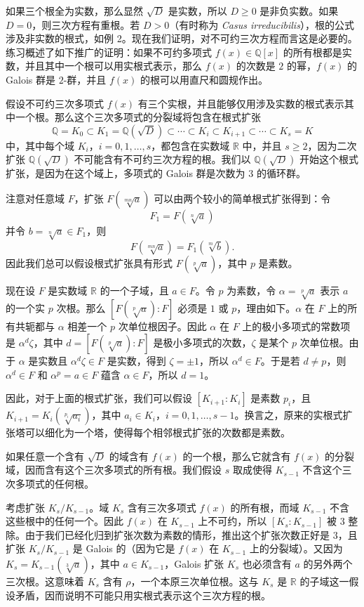 如果三个根全为实数，那么显然 $\sqrt D$ 是实数，所以 $D\geq 0$ 是非负实数。如果 $D=0$，则三次方程有重根。若 $D>0$（有时称为 \emph{Casus irreducibilis}），根的公式涉及非实数的根式，如例 2。现在我们证明，对不可约三次方程而言这是必要的。练习概述了如下推广的证明：如果不可约多项式 $f(x)\in\mathbb Q[x]$ 的所有根都是实数，并且其中一个根可以用实根式表示，那么 $f(x)$ 的次数是 $2$ 的幂，$f(x)$ 的 Galois 群是 $2$-群，并且 $f(x)$ 的根可以用直尺和圆规作出。

假设不可约三次多项式 $f(x)$ 有三个实根，并且能够仅用涉及实数的根式表示其中一个根。那么这个三次多项式的分裂域将包含在根式扩张
\[
\mathbb Q=K_0\subset K_1=\mathbb Q(\sqrt D)\subset\cdots\subset K_i\subset K_{i+1}\subset\cdots\subset K_s=K
\]
中，其中每个域 $K_i$，$i=0,1,\ldots,s$，都包含在实数域 $\mathbb R$ 中，并且 $s\geq 2$，因为二次扩张 $\mathbb Q(\sqrt D)$ 不可能含有不可约三次方程的根。我们以 $\mathbb Q(\sqrt D)$ 开始这个根式扩张，是因为在这个域上，多项式的 Galois 群是次数为 $3$ 的循环群。

注意对任意域 $F$，扩张 $F(\sqrt[mn]{a})$ 可以由两个较小的简单根式扩张得到：令
\[
F_1=F(\sqrt[n]{a})
\]
并令 $b=\sqrt[n]{a}\in F_1$，则
\[
F(\sqrt[mn]{a})=F_1(\sqrt[m]{b}).
\]
因此我们总可以假设根式扩张具有形式 $F(\sqrt[p]{a})$，其中 $p$ 是素数。

现在设 $F$ 是实数域 $\mathbb R$ 的一个子域，且 $a\in F$。令 $p$ 为素数，令 $\alpha=\sqrt[p]{a}$ 表示 $a$ 的一个实 $p$ 次根。那么 $[F(\sqrt[p]{a}):F]$ 必须是 $1$ 或 $p$，理由如下。$\alpha$ 在 $F$ 上的所有共轭都与 $\alpha$ 相差一个 $p$ 次单位根因子。因此 $\alpha$ 在 $F$ 上的极小多项式的常数项是 $\alpha^d\zeta$，其中 $d=[F(\sqrt[p]{a}):F]$ 是极小多项式的次数，$\zeta$ 是某个 $p$ 次单位根。由于 $\alpha$ 是实数且 $\alpha^d\zeta\in F$ 是实数，得到 $\zeta=\pm1$，所以 $\alpha^d\in F$。于是若 $d\neq p$，则 $\alpha^d\in F$ 和 $\alpha^p=a\in F$ 蕴含 $\alpha\in F$，所以 $d=1$。

因此，对于上面的根式扩张，我们可以假设 $[K_{i+1}:K_i]$ 是素数 $p_i$，且 $K_{i+1}=K_i(\sqrt[p_i]{a_i})$，其中 $a_i\in K_i$，$i=0,1,\ldots,s-1$。换言之，原来的实根式扩张塔可以细化为一个塔，使得每个相邻根式扩张的次数都是素数。

如果任意一个含有 $\sqrt D$ 的域含有 $f(x)$ 的一个根，那么它就含有 $f(x)$ 的分裂域，因而含有这个三次多项式的所有根。我们假设 $s$ 取成使得 $K_{s-1}$ 不含这个三次多项式的任何根。

考虑扩张 $K_s/K_{s-1}$。域 $K_s$ 含有三次多项式 $f(x)$ 的所有根，而域 $K_{s-1}$ 不含这些根中的任何一个。因此 $f(x)$ 在 $K_{s-1}$ 上不可约，所以 $[K_s:K_{s-1}]$ 被 $3$ 整除。由于我们已经化归到扩张次数为素数的情形，推出这个扩张次数正好是 $3$，且扩张 $K_s/K_{s-1}$ 是 Galois 的（因为它是 $f(x)$ 在 $K_{s-1}$ 上的分裂域）。又因为 $K_s=K_{s-1}(\sqrt[3]{a})$，其中 $a\in K_{s-1}$，Galois 扩张 $K_s$ 也必须含有 $a$ 的另外两个三次根。这意味着 $K_s$ 含有 $\rho$，一个本原三次单位根。这与 $K_s$ 是 $\mathbb R$ 的子域这一假设矛盾，因而说明不可能只用实根式表示这个三次方程的根。

